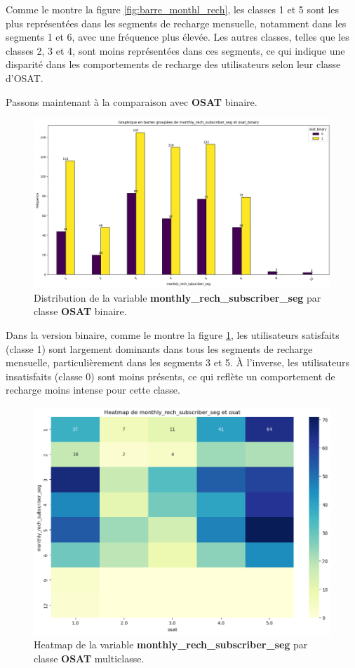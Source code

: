 Comme le montre la figure \ref{fig:barre_monthl_rech}, les classes 1 et 5 sont les plus représentées dans les segments de recharge mensuelle, notamment dans les segments 1 et 6, avec une fréquence plus élevée. Les autres classes, telles que les classes 2, 3 et 4, sont moins représentées dans ces segments, ce qui indique une disparité dans les comportements de recharge des utilisateurs selon leur classe d'OSAT.

Passons maintenant à la comparaison avec \textbf{OSAT} binaire.

\begin{figure}[H]
    \centering
    \includegraphics[width=0.7\linewidth]{barre_monthl_rech_binary.png}
    \caption{Distribution de la variable \textbf{monthly\_rech\_subscriber\_seg} par classe \textbf{OSAT} binaire.}
    \label{fig:barre_monthl_rech_binary}
\end{figure}

Dans la version binaire, comme le montre la figure \ref{fig:barre_monthl_rech_binary}, les utilisateurs satisfaits (classe 1) sont largement dominants dans tous les segments de recharge mensuelle, particulièrement dans les segments 3 et 5. À l'inverse, les utilisateurs insatisfaits (classe 0) sont moins présents, ce qui reflète un comportement de recharge moins intense pour cette classe.

\begin{figure}[H]
    \centering
    \includegraphics[width=0.7\linewidth]{heatmap_monthly_recharge.png}
    \caption{Heatmap de la variable \textbf{monthly\_rech\_subscriber\_seg} par classe \textbf{OSAT} multiclasse.}
    \label{fig:heatmap_monthly_recharge}
\end{figure}

